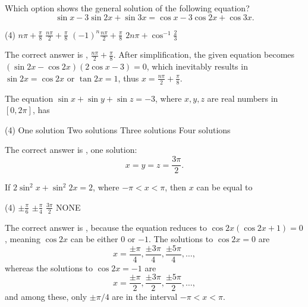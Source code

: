 \documentclass[12pt,a4paper]{memoir}
\theoremstyle{definition}
\newcommand{\correct}{
    \PrintSolutionsTF{%
        \ref{ans:\CurrentQuestionID}%
        }{%
        \label{ans:\CurrentQuestionID}%
        }%
}
\begin{document}
\begin{question}[name=1989 IIT]
	Which option shows the general solution of the following equation?
	$$\sin x - 3 \sin 2x + \sin 3x =\cos x - 3 \cos 2x + \cos 3x.$$
	\begin{tasks}(4)
		\task $\displaystyle n\pi+ \frac{\pi}{8}$
		\task \correct $\displaystyle \frac{n\pi}{2}+ \frac{\pi}{8}$
		\task $\displaystyle (-1)^n\frac{n\pi}{2}+ \frac{\pi}{8}$
		\task $\displaystyle 2n\pi+ \cos^{-1}\frac{2}{3}$
	\end{tasks}
\end{question}
\begin{solution}
	The correct answer is \correct, $\frac{n\pi}{2}+ \frac{\pi}{8}$. After simplification, the given equation becomes $(\sin 2x - \cos 2x)(2\cos x - 3)=0$, which inevitably results in $\sin 2x = \cos 2x$ or $\tan 2x = 1$, thus $x=\frac{n\pi}{2}+ \frac{\pi}{8}$.
\end{solution}


\begin{question}[name=2003 Orissa JEE]
	The equation $\sin x + \sin y + \sin z = -3$, where $x,y,z$ are real numbers in $[0,2\pi]$, has
	\begin{tasks}(4)
		\task \correct One solution
		\task  Two solutions
		\task Three solutions
		\task Four solutions
	\end{tasks}
\end{question}
\begin{solution}
	The correct answer is \correct, one solution: $$x=y=z=\frac{3\pi}{2}.$$
\end{solution}



\begin{question}[name=1989 ISM Dhanbad]
	If $2\sin^2 x + \sin^2 2x = 2$, where $-\pi<x<\pi$, then $x$ can be equal to
	\begin{tasks}(4)
		\task $\displaystyle \pm\frac{\pi}{6}$
		\task \correct $\displaystyle \pm\frac{\pi}{4}$
		\task $\displaystyle \frac{3\pi}{2}$
		\task NONE
	\end{tasks}
\end{question}
\begin{solution}
	The correct answer is \correct, because the equation reduces to $\cos 2x (\cos 2x+1)= 0$, meaning $\cos 2x$ can be either $0$ or $-1$. The solutions to $\cos 2x = 0$ are $$x=\frac{\pm \pi}{4}, \frac{\pm 3\pi}{4}, \frac{\pm 5\pi}{4}, \dots,$$
	whereas the solutions to $\cos 2x = -1$ are
	$$x=\frac{\pm \pi}{2}, \frac{\pm 3\pi}{2}, \frac{\pm 5\pi}{2}, \dots,$$
	and among these, only $\pm \pi/4$ are in the interval $-\pi < x < \pi$.
\end{solution}
\end{document}
